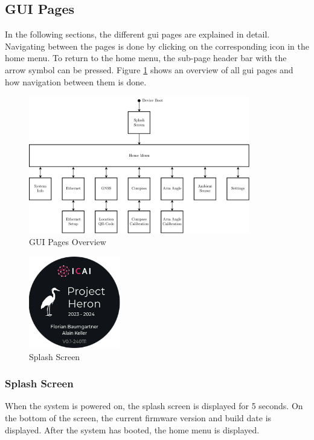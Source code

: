\subsection{GUI Pages}
In the following sections, the different \acrshort{gui} pages are explained in detail.
Navigating between the pages is done by clicking on the corresponding icon in the home menu.
To return to the home menu, the sub-page header bar with the arrow symbol can be pressed.
Figure \ref{fig:gui_pages_overview} shows an overview of all \acrshort{gui} pages and how navigation between them is done.
\begin{figure}[h!]
	\centering
	\vspace{-0.5cm}
	\includegraphics[width=0.86\textwidth]{images/6_design_final/final_design_gui_pages.pdf}
	\caption{GUI Pages Overview}
	\label{fig:gui_pages_overview}
\end{figure}
\newpage

\begin{minipage}{\linewidth}
	\begin{figure}
		\vspace{-0.6cm}
		\includegraphics[width=4cm]{images/6_design_final/gui/00_splash_screen.png}
		\centering
		\caption{Splash Screen}
		\label{fig:final_design_gui_splash_screen}
	\end{figure}
	\subsubsection{Splash Screen}
	When the system is powered on, the splash screen is displayed for 5 seconds.
	On the bottom of the screen, the current firmware version and build date is displayed.
	After the system has booted, the home menu is displayed.
\end{minipage}
\vspace{2.0cm}		%

